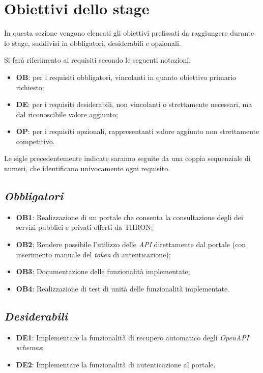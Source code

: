 \section{Obiettivi dello stage}\label{sec:obiettivi-stage}
In questa sezione vengono elencati gli obiettivi prefissati da raggiungere durante lo stage, suddivisi in obbligatori, desiderabili e opzionali.

Si farà riferimento ai requisiti secondo le seguenti notazioni:
\begin{itemize}
    \item \textbf{OB}: per i requisiti obbligatori, vincolanti in quanto obiettivo primario richiesto;
    \item \textbf{DE}: per i requisiti desiderabili, non vincolanti o strettamente necessari, ma dal riconoscibile valore aggiunto;
    \item \textbf{OP}: per i requisiti opzionali, rappresentanti valore aggiunto non strettamente competitivo.
\end{itemize}
Le sigle precedentemente indicate saranno seguite da una coppia sequenziale di numeri, che identificano univocamente ogni requisito.

\subsection*{\emph{Obbligatori}}\label{subsec:obiettivi-obbligatori}
\begin{itemize}
    \item \textbf{OB1}: Realizzazione di un portale che consenta la consultazione degli  dei servizi pubblici e privati offerti da THRON;
    \item \textbf{OB2}: Rendere possibile l'utilizzo delle \textit{API} direttamente dal portale (con inserimento manuale del \textit{token} di autenticazione);
    \item \textbf{OB3}: Documentazione delle funzionalità implementate;
    \item \textbf{OB4}: Realizzazione di test di unità delle funzionalità implementate.
\end{itemize}

\subsection*{\emph{Desiderabili}}\label{subsec:obiettivi-desiderabili}
\begin{itemize}
    \item \textbf{DE1}: Implementare la funzionalità di recupero automatico degli \textit{OpenAPI schemas};
    \item \textbf{DE2}: Implementare la funzionalità di autenticazione al portale.
\end{itemize}

